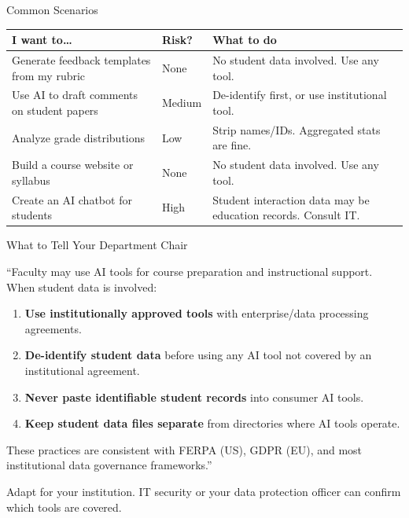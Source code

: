 \documentclass[aspectratio=169, 10pt]{beamer}
\begin{document}
\begin{frame}{Common Scenarios}

\footnotesize

\renewcommand{\arraystretch}{1.4}
\begin{tabular}{>{\raggedright\arraybackslash}p{4.2cm} >{\centering\arraybackslash}p{2.2cm} >{\raggedright\arraybackslash}p{5.8cm}}
\toprule
\textbf{I want to\ldots} & \textbf{Risk?} & \textbf{What to do} \\
\midrule
\rowcolor{PaleSage}
Generate feedback templates from my rubric & \textcolor{SlateTeal}{None} & No student data involved. Use any tool. \\
Use AI to draft comments on student papers & \textcolor{UVMGold}{Medium} & De-identify first, or use institutional tool. \\
\rowcolor{PaleSage}
Analyze grade distributions & \textcolor{UVMGold}{Low} & Strip names/IDs. Aggregated stats are fine. \\
Build a course website or syllabus & \textcolor{SlateTeal}{None} & No student data involved. Use any tool. \\
\rowcolor{PaleSage}
Create an AI chatbot for students & \textcolor{SoftCoral}{High} & Student interaction data may be education records. Consult IT. \\
\bottomrule
\end{tabular}

\end{frame}


\begin{frame}{What to Tell Your Department Chair}

\begin{tcolorbox}[keybox, title={\faFile\quad Template Language for Department Policies}]
\footnotesize
``Faculty may use AI tools for course preparation and instructional support. When student data is involved:

\begin{enumerate}\footnotesize
  \item \textbf{Use institutionally approved tools} with enterprise/data processing agreements.
  \item \textbf{De-identify student data} before using any AI tool not covered by an institutional agreement.
  \item \textbf{Never paste identifiable student records} into consumer AI tools.
  \item \textbf{Keep student data files separate} from directories where AI tools operate.
\end{enumerate}

\vspace{-2pt}
These practices are consistent with FERPA (US), GDPR (EU), and most institutional data governance frameworks.''
\end{tcolorbox}

\vspace{0.2cm}
\centering\small
Adapt for your institution. IT security or your data protection officer can confirm which tools are covered.

\end{frame}
\end{document}
